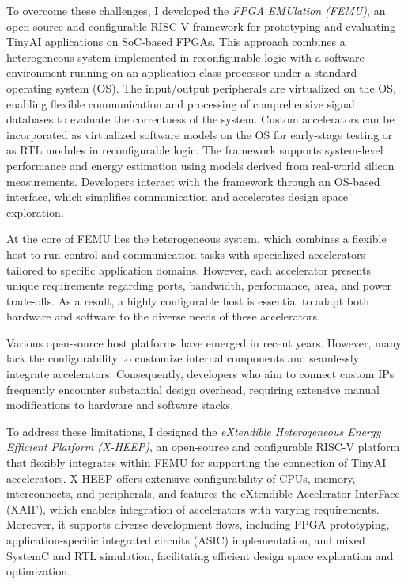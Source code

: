     To overcome these challenges, I developed the \textit{FPGA EMUlation (\mbox{FEMU})}, an open-source and configurable RISC-V framework for prototyping and evaluating \mbox{TinyAI} applications on SoC-based FPGAs. This approach combines a heterogeneous system implemented in reconfigurable logic with a software environment running on an application-class processor under a standard operating system (OS). The input/output peripherals are virtualized on the OS, enabling flexible communication and processing of comprehensive signal databases to evaluate the correctness of the system. Custom accelerators can be incorporated as virtualized software models on the OS for early-stage testing or as RTL modules in reconfigurable logic. The framework supports system-level performance and energy estimation using models derived from real-world silicon measurements. Developers interact with the framework through an OS-based interface, which simplifies communication and accelerates design space exploration.
    
    \thispagestyle{plain}
    At the core of \mbox{FEMU} lies the heterogeneous system, which combines a flexible host to run control and communication tasks with specialized accelerators tailored to specific application domains. However, each accelerator presents unique requirements regarding ports, bandwidth, performance, area, and power trade-offs. As a result, a highly configurable host is essential to adapt both hardware and software to the diverse needs of these accelerators.
    
    Various open-source host platforms have emerged in recent years. However, many lack the configurability to customize internal components and seamlessly integrate accelerators. Consequently, developers who aim to connect custom IPs frequently encounter substantial design overhead, requiring extensive manual modifications to hardware and software stacks.
    
    To address these limitations, I designed the \textit{eXtendible Heterogeneous Energy Efficient Platform (X-HEEP)}, an open-source and configurable RISC-V platform that flexibly integrates within \mbox{FEMU} for supporting the connection of \mbox{TinyAI} accelerators. X-HEEP offers extensive configurability of CPUs, memory, interconnects, and peripherals, and features the eXtendible Accelerator InterFace (XAIF), which enables integration of accelerators with varying requirements. Moreover, it supports diverse development flows, including FPGA prototyping, application-specific integrated circuits (ASIC) implementation, and mixed SystemC and RTL simulation, facilitating efficient design space exploration and optimization.
    
